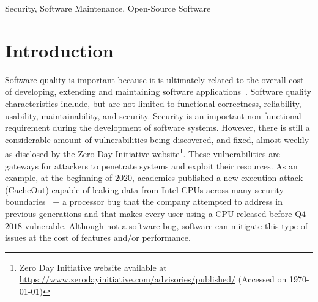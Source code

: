\documentclass[10pt,conference]{IEEEtran}
\begin{document}
\begin{IEEEkeywords}
Security, Software Maintenance, Open-Source Software
\end{IEEEkeywords}

\section{Introduction}
%
Software quality is important because it is ultimately related to the overall
cost of developing, extending and maintaining software applications~\cite{slaughter1998evaluating}. 
Software quality characteristics include, but are not limited to functional correctness,
reliability, usability, maintainability, and security. Security is an 
important non-functional requirement during the development of software systems. 
However, there is still a considerable amount of vulnerabilities being
discovered, and fixed, almost weekly as disclosed by the Zero Day Initiative
website\footnote{Zero Day Initiative website available at
\url{https://www.zerodayinitiative.com/advisories/published/} (Accessed on \today{})}.
These vulnerabilities are gateways for attackers to penetrate systems and 
exploit their resources. As an example, at the beginning of $2020$, academics published a 
new execution attack (CacheOut) capable of leaking data from Intel CPUs across many 
security boundaries~\cite{cacheOut} $-$ a processor bug that the company attempted to 
address in previous generations and that makes every user using a CPU released before Q$4$ $2018$ vulnerable. Although not a software bug, software can mitigate this type of issues
at the cost of features and/or performance.
%
\end{document}
